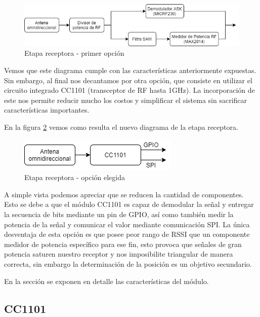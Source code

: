 \begin{figure}[htb]
	\centering
	\includegraphics[scale=0.6]{images/Opcion1.png}
    \caption{Etapa receptora - primer opción}
	\label{EtapaReceptora1}
\end{figure}


Vemos que este diagrama cumple con las características anteriormente expuestas. Sin embargo, al final nos decantamos por otra opción, 
que consiste en utilizar el circuito integrado CC1101 (transceptor de RF hasta 1GHz). La incorporación de este nos permite reducir mucho los costos y simplificar
el sistema sin sacrificar características importantes. \par
En la figura \ref{EtapaReceptora2} vemos como resulta el nuevo diagrama de la etapa receptora. \par

\begin{figure}[htb]
	\centering
	\includegraphics[scale=0.6]{images/Opcion2.png}
    \caption{Etapa receptora - opción elegida}
	\label{EtapaReceptora2}
\end{figure}

A simple vista podemos apreciar que se reducen la cantidad de componentes. Esto se debe a que el módulo CC1101 es capaz de demodular la señal y
entregar la secuencia de bits mediante un pin de GPIO, así como también medir la potencia de la señal y comunicar el valor mediante comunicación SPI.
La única desventaja de esta opción es que posee peor rango de RSSI que un componente medidor de potencia específico para ese fin,
esto provoca que señales de gran potencia saturen nuestro receptor y nos imposibilite triangular de manera correcta, sin embargo la determinación 
de la posición es un objetivo secundario. \par
En la sección \cite{cc1101} se exponen en detalle las características del módulo.\par

\subsection{CC1101} \label{cap:cc1101}
